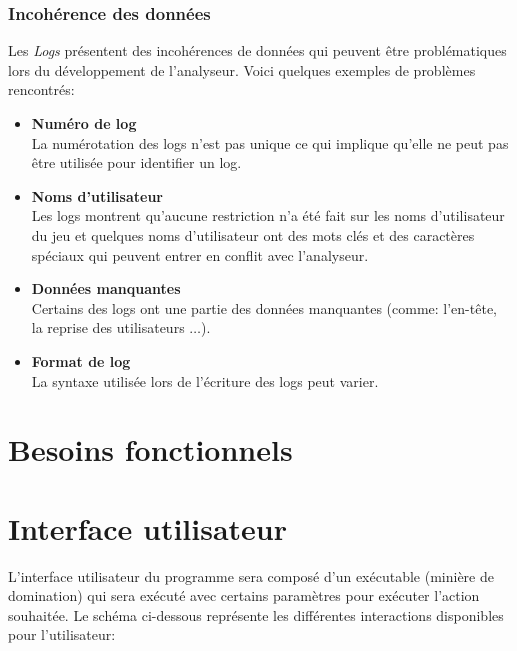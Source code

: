 \documentclass{scrreprt}
\begin{document}
\subsubsection{Incohérence des données}
Les \textit{Logs} présentent des incohérences de données qui peuvent être problématiques lors du développement de l'analyseur. Voici quelques exemples de problèmes rencontrés:

\begin{itemize}
  \item \textbf{Numéro de log}\\
   La numérotation des logs n'est pas unique ce qui implique qu'elle ne peut pas être utilisée pour identifier un log.
  \item \textbf{Noms d'utilisateur}\\
    Les logs montrent qu'aucune restriction n’a été fait sur les noms d'utilisateur du jeu et quelques noms d'utilisateur ont des mots clés et des caractères spéciaux qui peuvent entrer en conflit avec l'analyseur.
   \item \textbf{Données manquantes}\\
    Certains des logs ont une partie des données manquantes (comme: l'en-tête, la reprise des utilisateurs $\ldots$).
   \item \textbf{Format de log}\\
    La syntaxe utilisée lors de l'écriture des logs peut varier.
\end{itemize}

\section{Besoins fonctionnels}
\iffalse
\section{Interface utilisateur}
L'interface utilisateur du programme sera composé d'un exécutable (minière de domination) qui sera exécuté avec certains paramètres pour exécuter l'action souhaitée. Le schéma ci-dessous représente les différentes interactions disponibles pour l'utilisateur:\\
\end{document}

